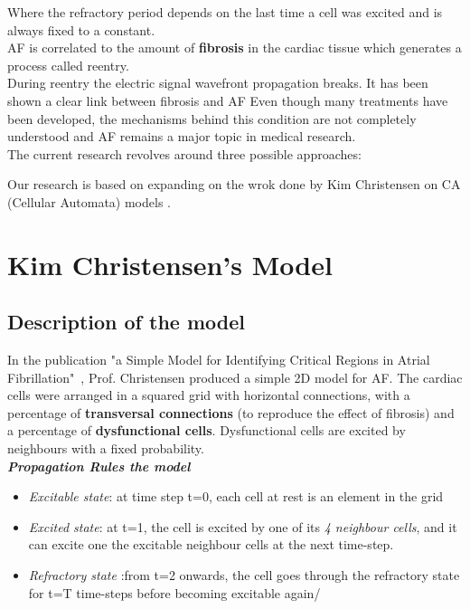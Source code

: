 \documentclass[twocolumn, a1paper, 12pt]{article}
\begin{document}
Where the refractory period depends on the last time a cell was excited and is always fixed to a constant.\\



AF is correlated to the amount of \textbf{ fibrosis} in the cardiac tissue which generates a process called reentry. \\
During reentry the electric signal wavefront propagation breaks. It has been shown a clear link between fibrosis and AF
Even though many treatments have been developed, the mechanisms behind this condition are not completely understood and AF remains a major topic in medical research. \\
The current research revolves around three possible approaches:


 
 Our research is based on expanding on the wrok done by Kim Christensen on CA (Cellular Automata) models \cite{Christensen}.




\section{\textbf{Kim Christensen's Model}}

\subsection{Description of the model}

In the publication "a Simple Model for Identifying Critical Regions in Atrial Fibrillation"~\cite{Christensen}, Prof. Christensen produced a simple 2D model for AF. The cardiac cells were arranged in a squared grid with horizontal connections, with a percentage of \textbf{ transversal connections} (to reproduce the effect of fibrosis) and a percentage of \textbf{dysfunctional cells}.
Dysfunctional cells are excited by neighbours with a fixed probability.\\

\textbf{\textit{Propagation Rules the model}}\\

\begin{itemize}
  \item \textit{Excitable state}: at time step t=0, each cell at rest is an element in the grid 

  										
  \item \textit{Excited state}: at t=1, the cell is excited by one of its \textit{ 4 neighbour cells}, and it can excite one the excitable neighbour cells at the next time-step.
  \item \textit{Refractory state} :from t=2 onwards, the cell goes through the refractory state for t=T time-steps before becoming excitable again/
\end{itemize}  
\end{document}
